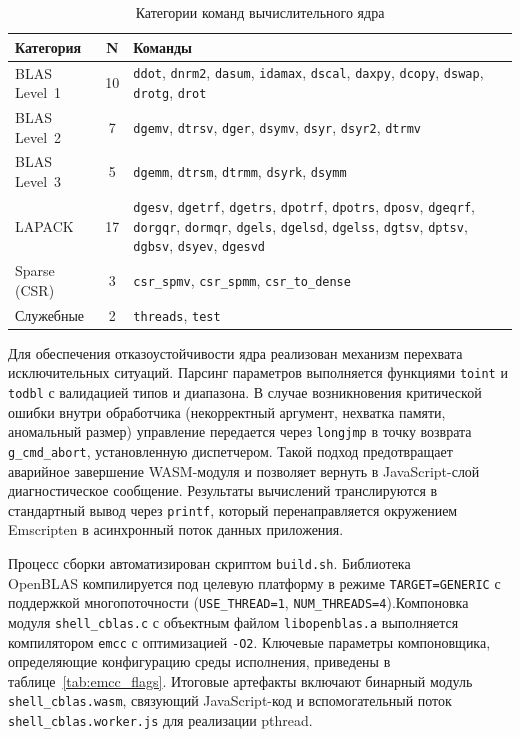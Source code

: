 \documentclass[12pt, oneside]{book}
\begin{document}
\begin{table}[htbp]
\centering
\scriptsize
\renewcommand{\arraystretch}{1.15}
\begin{tabular}{|p{2.3cm}|c|p{8.7cm}|}
\hline
\rowcolor{thbg} \textbf{Категория} & \textbf{N} & \textbf{Команды} \\
\hline
BLAS Level~1 & 10 & \texttt{ddot}, \texttt{dnrm2}, \texttt{dasum}, \texttt{idamax}, \texttt{dscal}, \texttt{daxpy}, \texttt{dcopy}, \texttt{dswap}, \texttt{drotg}, \texttt{drot} \\
\hline
BLAS Level~2 & 7 & \texttt{dgemv}, \texttt{dtrsv}, \texttt{dger}, \texttt{dsymv}, \texttt{dsyr}, \texttt{dsyr2}, \texttt{dtrmv} \\
\hline
BLAS Level~3 & 5 & \texttt{dgemm}, \texttt{dtrsm}, \texttt{dtrmm}, \texttt{dsyrk}, \texttt{dsymm} \\
\hline
LAPACK & 17 & \texttt{dgesv}, \texttt{dgetrf}, \texttt{dgetrs}, \texttt{dpotrf}, \texttt{dpotrs}, \texttt{dposv}, \texttt{dgeqrf}, \texttt{dorgqr}, \texttt{dormqr}, \texttt{dgels}, \texttt{dgelsd}, \texttt{dgelss}, \texttt{dgtsv}, \texttt{dptsv}, \texttt{dgbsv}, \texttt{dsyev}, \texttt{dgesvd} \\
\hline
Sparse (CSR) & 3 & \texttt{csr\_spmv}, \texttt{csr\_spmm}, \texttt{csr\_to\_dense} \\
\hline
Служебные & 2 & \texttt{threads}, \texttt{test} \\
\hline
\end{tabular}
\caption{Категории команд вычислительного ядра}
\label{tab:core_commands}
\end{table}

    \quad Для обеспечения отказоустойчивости ядра реализован механизм перехвата исключительных ситуаций. Парсинг параметров выполняется функциями \texttt{toint} и \texttt{todbl} с валидацией типов и диапазона. В случае возникновения критической ошибки внутри обработчика (некорректный аргумент, нехватка памяти, аномальный размер) управление передается через \texttt{longjmp} в точку возврата \texttt{g\_cmd\_abort}, установленную диспетчером. Такой подход предотвращает аварийное завершение WASM-модуля и позволяет вернуть в JavaScript-слой диагностическое сообщение. Результаты вычислений транслируются в стандартный вывод через \texttt{printf}, который перенаправляется окружением Emscripten в асинхронный поток данных приложения.

    \quad Процесс сборки автоматизирован скриптом \texttt{build.sh}. Библиотека\\ OpenBLAS компилируется под целевую платформу в режиме \texttt{TARGET=GENERIC} с поддержкой многопоточности (\texttt{USE\_THREAD=1}, \texttt{NUM\_THREADS=4}).Компоновка модуля  \texttt{shell\_cblas.c} с объектным файлом \texttt{libopenblas.a} выполняется компилятором \texttt{emcc} с оптимизацией \texttt{-O2}. Ключевые параметры компоновщика, определяющие конфигурацию среды исполнения, приведены в таблице~\ref{tab:emcc_flags}. Итоговые артефакты включают бинарный модуль \texttt{shell\_cblas.wasm}, связующий JavaScript-код и вспомогательный поток \texttt{shell\_cblas.worker.js} для реализации pthread.
\end{document}
